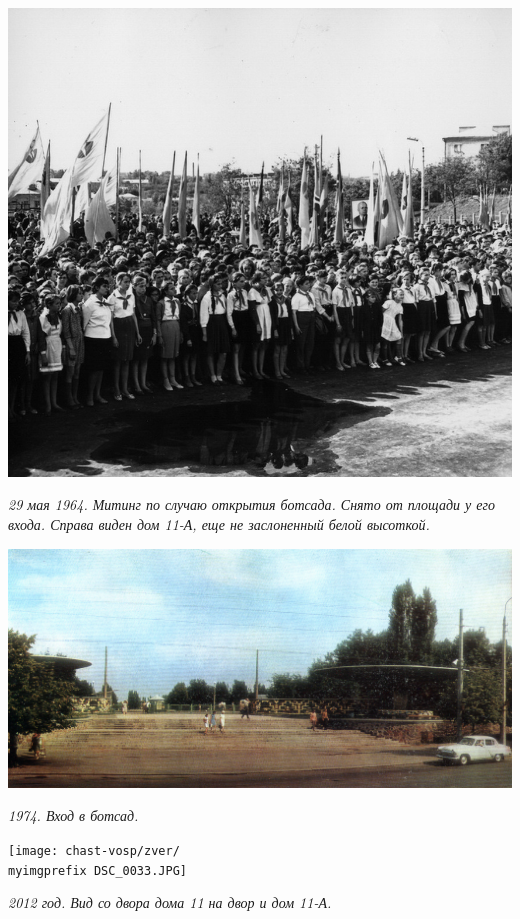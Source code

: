 \begin{center}
\includegraphics[width=\linewidth]{chast-vosp/zver/1964-botsad.jpg}

\textit{29 мая 1964. Митинг по случаю открытия ботсада. Снято от площади у его входа. Справа виден дом 11-А, еще не заслоненный белой высоткой.}
\end{center}

\begin{center}
\includegraphics[width=\linewidth]{chast-vosp/zver/1974-botsad.jpg}

\textit{1974. Вход в ботсад.}
\end{center}

\begin{center}
\texttt{[image: chast-vosp/zver/\\myimgprefix DSC\_0033.JPG]}

\textit{2012 год. Вид со двора дома 11 на двор и дом 11-А.}
\end{center}

